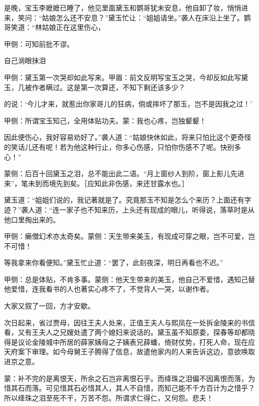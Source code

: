 \begin{parag}
    是晚，宝玉李嬷嬷已睡了，他见里面黛玉和鹦哥犹未安息，他自卸了妆，悄悄进来，笑问：“姑娘怎么还不安息？”黛玉忙让：“姐姐请坐。”袭人在床沿上坐了。鹦哥笑道：“林姑娘正在这里伤心，\begin{note}甲侧：可知前批不谬。\end{note}自己淌眼抹泪\begin{note}甲侧：黛玉第一次哭却如此写来。甲眉：前文反明写宝玉之哭，今却反如此写黛玉，几被作者瞒过。这是第一次算还，不知下剩还该多少？\end{note}的说：‘今儿才来，就惹出你家哥儿的狂病，倘或摔坏了那玉，岂不是因我之过！’\begin{note}甲侧：所谓宝玉知己，全用体贴功夫。蒙：我也心疼，岂独颦颦！\end{note}因此便伤心，我好容易劝好了。”袭人道：“姑娘快休如此，将来只怕比这个更奇怪的笑话儿还有呢！若为他这种行止，你多心伤感，只怕你伤感不了呢。快别多心！”\begin{note}蒙侧：后百十回黛玉之泪，总不能出此二语。“月上窗纱人到阶，窗上影儿先进来”，笔未到而境先到矣。［应知此非伤感，来还甘露水也。］\end{note}黛玉道：“姐姐们说的，我记著就是了。究竟那玉不知是怎么个来历？上面还有字迹？”袭人道：“连一家子也不知来历，上头还有现成的眼儿，听得说，落草时是从他口里掏出来的。\begin{note}甲侧：癞僧幻术亦太奇矣。蒙侧：天生带来美玉，有现成可穿之眼，岂不可爱，岂不可惜！\end{note}等我拿来你看便知。”黛玉忙止道：“罢了，此刻夜深，明日再看也不迟。”\begin{note}甲侧：总是体贴，不肯多事。蒙侧：他天生带来的美玉，他自己不爱惜，遇知己替他爱惜，连我看书的人也著实心疼不了，不觉背人一哭，以谢作者。\end{note}大家又叙了一回，方才安歇。
\end{parag}


\begin{parag}
    次日起来，省过贾母，因往王夫人处来，正值王夫人与熙凤在一处拆金陵来的书信看，又有王夫人之兄嫂处遣了两个媳妇来说话的。黛玉虽不知原委，探春等却都晓得是议论金陵城中所居的薛家姨母之子姨表兄薛蟠，倚财仗势，打死人命，现在应天府案下审理。如今母舅王子腾得了信息，故遣他家内的人来告诉这边，意欲唤取进京之意。
\end{parag}


\begin{parag}
    \begin{note}蒙：补不完的是离恨天，所余之石岂非离恨石乎。而绛珠之泪偏不因离恨而落，为惜其石而落。可见惜其石必惜其人，其人不自惜，而知己能不千方百计为之惜乎？所以绛珠之泪至死不干，万苦不怨。所谓求仁得仁，又何怨。悲夫！\end{note}
\end{parag}